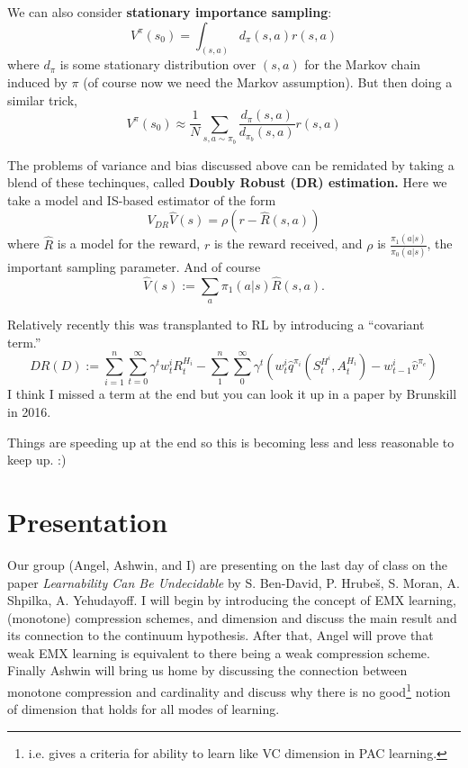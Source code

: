 \documentclass[12pt]{article}
\begin{document}
We can also consider \textbf{stationary importance sampling}: 
\[V^\pi(s_0)=\int_{(s,a)}d_\pi(s,a)r(s,a)\]
where $d_\pi$ is some stationary distribution over $(s,a)$ for the Markov chain induced by $\pi$ (of course now we need the Markov assumption). But then doing a similar trick,
\[V^\pi(s_0)\approx\frac{1}{N}\sum_{s,a\sim\pi_b}\frac{d_\pi(s,a)}{d_{\pi_b}(s,a)}r(s,a)\]

The problems of variance and bias discussed above can be remidated by taking a blend of these techinques, called \textbf{Doubly Robust (DR) estimation.} Here we take a model and IS-based estimator  of the form 
\[V_{DR}\hat V(s)=\rho(r-\hat R(s,a))\]
where $\hat R$ is a model for the reward, $r$ is the reward received, and $\rho$ is $\frac{\pi_1(a|s)}{\pi_0(a|s)}$, the important sampling parameter. And of course 
\[\hat V(s):=\sum_a\pi_1(a|s)\hat R(s,a).\]

Relatively recently this was transplanted to RL by introducing a ``covariant term.''
\[DR(D):=\sum_{i=1}^n\sum_{t=0}^\infty \gamma^tw_t^i R_t^{H_i}-\sum_{1}^n\sum_0^\infty\gamma^t(w_t^i\hat q^{\pi_i}(S_t^{H^i},A_t^{H_i})-w_{t-1}^i\hat v^{\pi_e})\]
I think I missed a term at the end but you can look it up in a paper by Brunskill in 2016.

Things are speeding up at the end so this is becoming less and less reasonable to keep up. :)

\pagebreak

\section{Presentation}
Our group (Angel, Ashwin, and I) are presenting on the last day of class on the paper \textit{Learnability Can Be Undecidable} by S. Ben-David, P. Hrube\v s, S. Moran, A. Shpilka, A. Yehudayoff. I will begin 
by introducing the concept of EMX learning, (monotone) compression schemes, and dimension and discuss the main result and its connection to the continuum hypothesis. After that, Angel will prove that weak 
EMX learning is equivalent to there being a weak compression scheme. Finally Ashwin will bring us home by discussing the connection between monotone compression and cardinality and discuss why there is no
good\footnote{i.e. gives a criteria for ability to learn like VC dimension in PAC learning.} notion of dimension that holds for all modes of learning.
\end{document}
